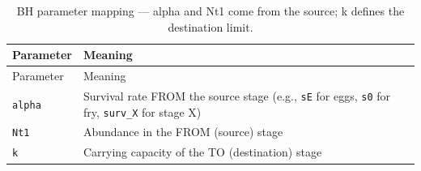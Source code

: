 \documentclass[
  letterpaper,
  DIV=11,
  numbers=noendperiod]{scrreprt}
\begin{document}
\begin{tcolorbox}
\begin{longtable}[]{@{}
  >{\raggedright\arraybackslash}p{}
  >{\raggedright\arraybackslash}p{}@{}}
\caption{BH parameter mapping --- alpha and Nt1 come from the source; k
defines the destination limit.}\tabularnewline
\toprule\noalign{}
\begin{minipage}[b]{\linewidth}\raggedright
Parameter
\end{minipage} & \begin{minipage}[b]{\linewidth}\raggedright
Meaning
\end{minipage} \\
\midrule\noalign{}
\endfirsthead
\toprule\noalign{}
\begin{minipage}[b]{\linewidth}\raggedright
Parameter
\end{minipage} & \begin{minipage}[b]{\linewidth}\raggedright
Meaning
\end{minipage} \\
\midrule\noalign{}
\endhead
\bottomrule\noalign{}
\endlastfoot
\texttt{alpha} & Survival rate FROM the source stage (e.g., \texttt{sE}
for eggs, \texttt{s0} for fry, \texttt{surv\_X} for stage X) \\
\texttt{Nt1} & Abundance in the FROM (source) stage \\
\texttt{k} & Carrying capacity of the TO (destination) stage \\
\end{longtable}

\end{tcolorbox}
\end{document}
